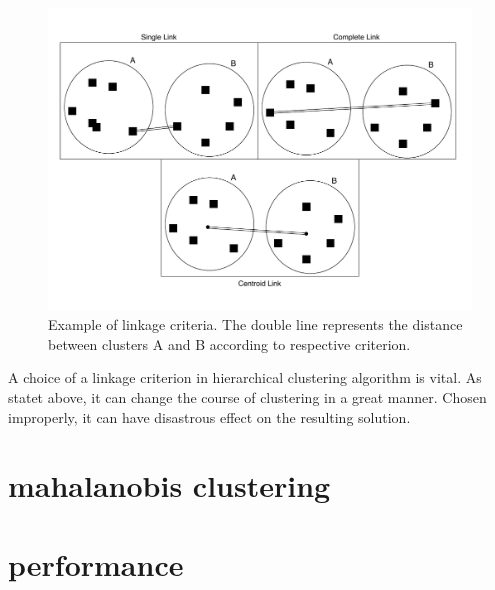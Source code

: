 \begin{figure}\centering
	\includegraphics[width=\linewidth]{img/linkage_criteria}
	\caption{Example of linkage criteria. The double line represents the distance between clusters A and B according to respective criterion.}
	\label{fig01:link}
\end{figure}

A choice of a linkage criterion in hierarchical clustering algorithm is vital. As statet above, it can change the course of clustering in a great manner. Chosen improperly, it can have disastrous effect on the resulting solution.

\section{mahalanobis clustering}


\section{performance}
